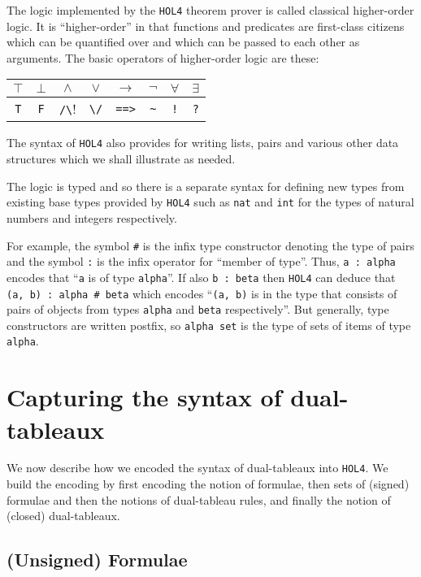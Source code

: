 \documentclass[a4paper]{article}
\newcommand{\hol}{\texttt{HOL4}}
\begin{document}
The logic implemented by the \hol{} theorem prover is called
classical higher-order logic. It is ``higher-order'' in that functions and
predicates are first-class citizens which can be quantified over and
which can be passed to each other as arguments. The basic operators of
higher-order logic are
these:

\begin{center}
\begin{tabular}[c]{|c|c|c|c|c|c|c|c|}
\hline
 $\top$ & $\bot$ & $\land$ & $\lor$ & $\to$ & $\lnot$ & $\forall$ & $\exists$
\\ \hline
 \texttt{T} & \texttt{F} & \verb!/\! & \verb!\/! & \texttt{==>} & \verb!~! & \texttt{!} & \texttt{?} 
\\ \hline
\end{tabular}
\end{center}


The syntax of \hol{} also provides for writing lists, pairs and various other
data structures which we shall illustrate as needed. 

The logic is typed and so there is a separate syntax for defining new
types from existing base types provided by \hol{} such as \texttt{nat}
and \texttt{int} for the types of natural numbers and integers
respectively. 

For example, the symbol \texttt{\#} is the infix type constructor
denoting the type of pairs and the symbol \texttt{:} is the infix
operator for ``member of type''. Thus, \mbox{\texttt{a :\ alpha}} encodes that
``\texttt{a} is of type \texttt{alpha}''. 
If also \mbox{\texttt{b :\ beta}} then \hol{}
can deduce that \texttt{(a, b) :\ alpha \# beta} which encodes
``\texttt{(a, b)} is in the type that consists of pairs of objects from
types \texttt{alpha} and \texttt{beta} respectively''.  But generally,
type constructors are written postfix, so \texttt{alpha set} is the type
of sets of items of type \texttt{alpha}.

\section{Capturing the syntax of dual-tableaux}

We now describe how we encoded the syntax of dual-tableaux into \hol.
We build the encoding by first encoding the notion of formulae,
then sets of (signed) formulae and then the notions of dual-tableau
rules, and finally the notion of (closed) dual-tableaux.

\subsection{(Unsigned) Formulae}
\label{sec:unsigned-formulae}
\end{document}
